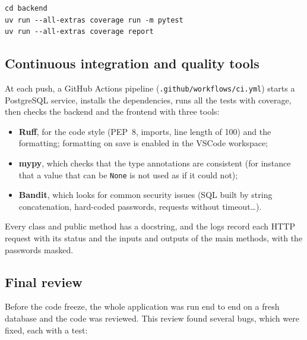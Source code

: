 \begin{lstlisting}
cd backend
uv run --all-extras coverage run -m pytest
uv run --all-extras coverage report
\end{lstlisting}

\subsection{Continuous integration and quality tools}

At each push, a GitHub Actions pipeline (\texttt{.github/workflows/ci.yml}) starts a PostgreSQL
service, installs the dependencies, runs all the tests with coverage, then checks the backend and
the frontend with three tools:

\begin{itemize}
  \item \textbf{Ruff}, for the code style (PEP~8, imports, line length of 100) and the formatting;
  formatting on save is enabled in the VSCode workspace;
  \item \textbf{mypy}, which checks that the type annotations are consistent (for instance that a
  value that can be \texttt{None} is not used as if it could not);
  \item \textbf{Bandit}, which looks for common security issues (SQL built by string
  concatenation, hard-coded passwords, requests without timeout\dots).
\end{itemize}

Every class and public method has a docstring, and the logs record each HTTP request with its
status and the inputs and outputs of the main methods, with the passwords masked.

\subsection{Final review}

Before the code freeze, the whole application was run end to end on a fresh database and the code
was reviewed. This review found several bugs, which were fixed, each with a test:

